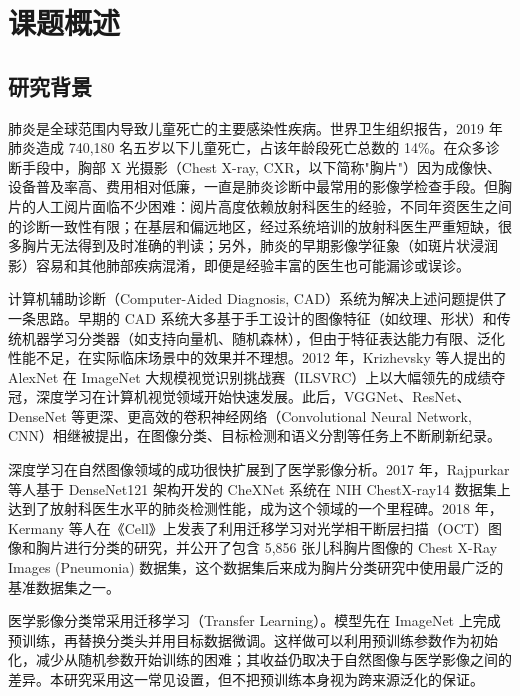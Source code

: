 \documentclass[12pt,a4paper,UTF8,openany]{ctexbook}
\begin{document}
\mainmatter

\chapter{课题概述}

\section{研究背景}

肺炎是全球范围内导致儿童死亡的主要感染性疾病。世界卫生组织报告，2019 年肺炎造成 740,180 名五岁以下儿童死亡，占该年龄段死亡总数的 14\%\cite{who2022}。在众多诊断手段中，胸部 X 光摄影（Chest X-ray, CXR，以下简称"胸片"）因为成像快、设备普及率高、费用相对低廉，一直是肺炎诊断中最常用的影像学检查手段。但胸片的人工阅片面临不少困难：阅片高度依赖放射科医生的经验，不同年资医生之间的诊断一致性有限；在基层和偏远地区，经过系统培训的放射科医生严重短缺，很多胸片无法得到及时准确的判读；另外，肺炎的早期影像学征象（如斑片状浸润影）容易和其他肺部疾病混淆，即便是经验丰富的医生也可能漏诊或误诊。

计算机辅助诊断（Computer-Aided Diagnosis, CAD）系统为解决上述问题提供了一条思路。早期的 CAD 系统大多基于手工设计的图像特征（如纹理、形状）和传统机器学习分类器（如支持向量机、随机森林），但由于特征表达能力有限、泛化性能不足，在实际临床场景中的效果并不理想\cite{huang2017}。2012 年，Krizhevsky 等人提出的 AlexNet 在 ImageNet 大规模视觉识别挑战赛（ILSVRC）上以大幅领先的成绩夺冠，深度学习在计算机视觉领域开始快速发展。此后，VGGNet、ResNet、DenseNet 等更深、更高效的卷积神经网络（Convolutional Neural Network, CNN）相继被提出，在图像分类、目标检测和语义分割等任务上不断刷新纪录\cite{huang2017}。

深度学习在自然图像领域的成功很快扩展到了医学影像分析。2017 年，Rajpurkar 等人基于 DenseNet121 架构开发的 CheXNet 系统在 NIH ChestX-ray14 数据集上达到了放射科医生水平的肺炎检测性能，成为这个领域的一个里程碑\cite{rajpurkar2017}。2018 年，Kermany 等人在《Cell》上发表了利用迁移学习对光学相干断层扫描（OCT）图像和胸片进行分类的研究，并公开了包含 5,856 张儿科胸片图像的 Chest X-Ray Images (Pneumonia) 数据集\cite{kermany2018}，这个数据集后来成为胸片分类研究中使用最广泛的基准数据集之一。

医学影像分类常采用迁移学习（Transfer Learning）。模型先在 ImageNet 上完成预训练，再替换分类头并用目标数据微调。这样做可以利用预训练参数作为初始化，减少从随机参数开始训练的困难；其收益仍取决于自然图像与医学影像之间的差异。本研究采用这一常见设置，但不把预训练本身视为跨来源泛化的保证。
\end{document}
